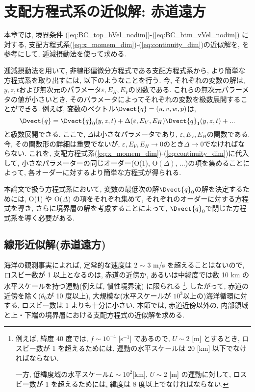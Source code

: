 \chapter{支配方程式系の近似解: 赤道遠方}
本章では, 境界条件 (\ref{eq:BC_top_hVel_nodim})-(\ref{eq:BC_btm_vVel_nodim}) に対する, 
支配方程式系(\ref{eq:x_momem_dim})-(\ref{eq:continuity_dim})の近似解を, 
\citet[chapter 4]{pedlosky1987geophysical} を参考にして, 逓減摂動法を使って求める. 

逓減摂動法を用いて, 非線形偏微分方程式である支配方程式系から, より簡単な方程式系を取り出すには, 
以下のようなことを行う. 
今, それぞれの変数の解は, $y,z,t$および無次元のパラメータ$\varepsilon, E_H, E_V$の関数である. 
これらの無次元パラーメタの値が小さいとき, そのパラメータによってそれぞれの変数を級数展開することができる. 
例えば, 変数のベクトル$\Dvect{q}=(u,v,w,p)$は, 
\begin{equation}
  \Dvect{q} = \Dvect{q}_0(y,z,t) + \Delta(\varepsilon,E_V,E_H)\Dvect{q}_1 (y,z,t) + ...
\label{eq:variable_expand}
\end{equation}
と級数展開できる. 
ここで, $\Delta$は小さなパラメータであり, $\varepsilon,E_V,E_H$の関数である. 
今, その関数形の詳細は重要でないが,   
$\varepsilon, E_V,E_H \to 0$のとき$\Delta \to 0$でなければならない. 
これを, 支配方程式系(\ref{eq:x_momem_dim})-(\ref{eq:continuity_dim})に代入して, 
小さなパラメーターの同じオーダー(O(1), O$(\Delta)$, ...)の項を集めることによって, 
各オーダーに対するより簡単な方程式が得られる. 

本論文で扱う方程式系において, 
変数の最低次の解$\Dvect{q}_0$の解を決定するためには, 
O(1) や O($\Delta$) の項をそれぞれ集めて, それぞれのオーダーに対する方程式を導き, 
さらに境界層の解を考慮することによって, 
$\Dvect{q}_0$で閉じた方程式系を導く必要がある. 

\section{線形近似解(赤道遠方)} 

海洋の観測事実によれば, 定常的な速度は 2 $\sim$ 3 m/s を超えることはないので, 
ロスビー数が 1 以上となるのは, 赤道の近傍か, あるいは中緯度では数 10 km の水平スケールを持つ運動(例えば, 慣性境界流)
に限られる%
\footnote{
例えば, 緯度 40 度では, $f \sim 10^{-4}$ [s$^{-1}$] であるので, $U \sim 2$ [m] とするとき, 
ロスビー数が 1 を超えるためには, 運動の水平スケールは 20 [km] 以下でなければならない. 

一方, 低緯度域の水平スケール$L \sim 10^2$[km], $U \sim 2$ [m] の運動に対して,   
ロスビー数が 1 を超えるためには, 緯度は 8 度以上でなければならない. 
}. 
したがって, 赤道の近傍を除く($\theta_0$が 10 度以上), 大規模な(水平スケールが $10^3$以上の)海洋循環に対する, 
ロスビー数は 1 よりも十分に小さい. 
本節では, 赤道近傍以外の, 内部領域と上・下端の境界層における支配方程式の近似解を求める. 

